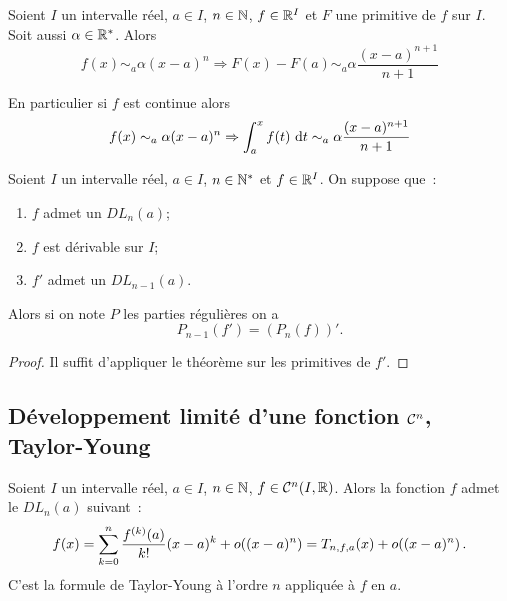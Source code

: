 \begin{corth}
  Soient \(I\) un intervalle réel, \(a \in I\), \(n \in \mathbb{N}\), \(f \in \mathbb{R}^I\) et
  \(F\) une primitive de \(f\) sur \(I\). Soit aussi \(\alpha \in \mathbb{R}^{*}\).
  Alors
  \begin{equation}
    f(x) \sim_a \alpha(x-a)^n \Rightarrow F(x)-F(a) \sim_a \alpha
    \frac{(x-a)^{n+1}}{n+1}
  \end{equation}

  En particulier si \(f\) est continue alors
  \begin{equation}
    f(x) \sim_a \alpha(x-a)^n \Rightarrow \int_a^x f(t)\,\mathop{}\mathopen{}\mathrm{d} t \sim_a \alpha
    \frac{(x-a)^{n+1}}{n+1}
  \end{equation}
\end{corth}

\begin{prop}
  Soient \(I\) un intervalle réel, \(a \in I\), \(n \in \mathbb{N}^*\) et \(f \in
  \mathbb{R}^I\). On suppose que~:
  \begin{enumerate}
    \item \(f\) admet un \(DL_n(a)\);
    \item \(f\) est dérivable sur \(I\);
    \item \(f'\) admet un \(DL_{n-1}(a)\).
  \end{enumerate}
  Alors si on note \(P\) les parties régulières on a
  \begin{equation}
    P_{n-1}(f') = (P_n(f))'.
  \end{equation}
\end{prop}
\begin{proof}
  Il suffit d'appliquer le théorème sur les primitives de \(f'\).
\end{proof}

\subsection[Développement limité d'une fonction \(\classe{n}\)]{Développement
limité d'une fonction \(\classe{n}\), Taylor-Young}

\begin{theo}
  Soient \(I\) un intervalle réel, \(a \in I\), \(n \in \mathbb{N}\), \(f \in
  \mathcal{C}^{n}(I,\mathbb{R})\). Alors la fonction \(f\) admet le \(DL_n(a)\) suivant~:
  \begin{equation}
    f(x) = \sum_{k = 0}^n \frac{f^{(k)}(a)}{k!} (x-a)^k + o\mathopen{}\left((x-a)^n\right) =
    T_{n,f,a}(x)+o\mathopen{}\left((x-a)^n\right).
  \end{equation}
  C'est la formule de Taylor-Young à l'ordre \(n\) appliquée à \(f\) en \(a\).
\end{theo}


